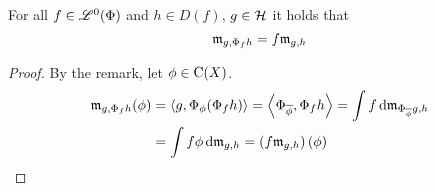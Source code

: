 \begin{defi}
\begin{lem}
 
  For all $f \in \mathscr{L}^0(\Phi)$ and $h \in D(f)$, $g\in \mathcal{H}$ it holds that
 \[
 \mathfrak{m}_{g, \Phi_f h} = f\mathfrak{m}_{g,h}
 \]

\end{lem}

\begin{proof}
 By the remark, let $\phi \in \operatorname{C}(X)$.
 \begin{align*}
   \mathfrak{m}_{g, \Phi_f h}(\phi) &= \left\langle g, \Phi_\phi (\Phi_f h) \right\rangle 
			  = \left\langle \Phi_{\overline{\phi}} , \Phi_f h \right\rangle
			  = \int f \operatorname{d}\! \mathfrak{m}_{\Phi_{\overline{\phi}} g, h}\\
			  &= \int f \phi \operatorname{d}\! \mathfrak{m}_{g,h}
			  = \left( f \mathfrak{m}_{g,h} \right)(\phi)
 \end{align*}

\end{proof}




\end{defi}






